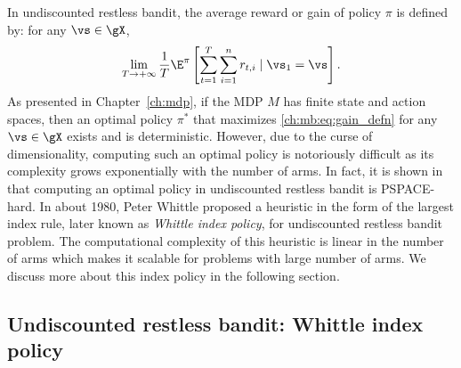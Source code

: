 In undiscounted restless bandit, the average reward or gain of policy $\pi$ is defined by: for any $\vs\in\gX$,
\begin{equation}
    \label{ch:mb:eq:gain_defn}
    \lim_{T\to+\infty}\frac1T \E^\pi\left[ \sum_{t=1}^{T} \sum_{i=1}^nr_{t,i} \mid \vs_1=\vs\right].
\end{equation}
As presented in Chapter~\ref{ch:mdp}, if the MDP $M$ has finite state and action spaces, then an optimal policy $\pi^*$ that maximizes \eqref{ch:mb:eq:gain_defn} for any $\vs\in\gX$ exists and is deterministic.
However, due to the curse of dimensionality, computing such an optimal policy is notoriously difficult as its complexity grows exponentially with the number of arms.
In fact, it is shown in \cite[Theorem~4]{papadimitriou1994complexity} that computing an optimal policy in undiscounted restless bandit is PSPACE-hard.
In about 1980, Peter Whittle proposed a heuristic in the form of the largest index rule, later known as \emph{Whittle index policy}, for undiscounted restless bandit problem.
The computational complexity of this heuristic is linear in the number of arms which makes it scalable for problems with large number of arms.  
We discuss more about this index policy in the following section.


\subsection{Undiscounted restless bandit: Whittle index policy}
\label{ch:mb:ssec:whittle_idx}


